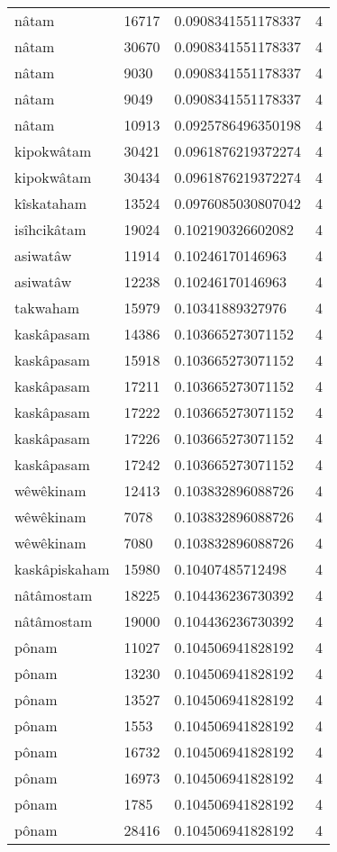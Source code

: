 \begin{longtable}{llll}
nâtam & 16717 & 0.0908341551178337 & 4 \\
nâtam & 30670 & 0.0908341551178337 & 4 \\
nâtam & 9030 & 0.0908341551178337 & 4 \\
nâtam & 9049 & 0.0908341551178337 & 4 \\
nâtam & 10913 & 0.0925786496350198 & 4 \\
kipokwâtam & 30421 & 0.0961876219372274 & 4 \\
kipokwâtam & 30434 & 0.0961876219372274 & 4 \\
kîskataham & 13524 & 0.0976085030807042 & 4 \\
isîhcikâtam & 19024 & 0.102190326602082 & 4 \\
asiwatâw & 11914 & 0.10246170146963 & 4 \\
asiwatâw & 12238 & 0.10246170146963 & 4 \\
takwaham & 15979 & 0.10341889327976 & 4 \\
kaskâpasam & 14386 & 0.103665273071152 & 4 \\
kaskâpasam & 15918 & 0.103665273071152 & 4 \\
kaskâpasam & 17211 & 0.103665273071152 & 4 \\
kaskâpasam & 17222 & 0.103665273071152 & 4 \\
kaskâpasam & 17226 & 0.103665273071152 & 4 \\
kaskâpasam & 17242 & 0.103665273071152 & 4 \\
wêwêkinam & 12413 & 0.103832896088726 & 4 \\
wêwêkinam & 7078 & 0.103832896088726 & 4 \\
wêwêkinam & 7080 & 0.103832896088726 & 4 \\
kaskâpiskaham & 15980 & 0.10407485712498 & 4 \\
nâtâmostam & 18225 & 0.104436236730392 & 4 \\
nâtâmostam & 19000 & 0.104436236730392 & 4 \\
pônam & 11027 & 0.104506941828192 & 4 \\
pônam & 13230 & 0.104506941828192 & 4 \\
pônam & 13527 & 0.104506941828192 & 4 \\
pônam & 1553 & 0.104506941828192 & 4 \\
pônam & 16732 & 0.104506941828192 & 4 \\
pônam & 16973 & 0.104506941828192 & 4 \\
pônam & 1785 & 0.104506941828192 & 4 \\
pônam & 28416 & 0.104506941828192 & 4 \\

\end{longtable}
